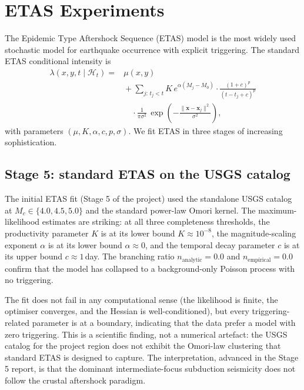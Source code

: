 \documentclass[10pt,a4paper,twocolumn]{article}
\begin{document}
\section{ETAS Experiments}\label{sec:etas-experiments}

The Epidemic Type Aftershock Sequence (ETAS) model \cite{ogata1988} is the most widely used stochastic model for earthquake occurrence with explicit triggering. The standard ETAS conditional intensity is
\begin{align*}
\lambda(x,y,t \mid \mathcal{H}_t) = {}& \mu(x,y) \\
&{} + \sum_{j:\,t_j<t} K\, e^{\alpha(M_j - M_0)} \cdot \frac{(1+c)^p}{(t - t_j + c)^p} \\
&{} \quad \cdot \frac{1}{\pi\sigma^2}\, \exp\!\left(-\frac{\|\mathbf{x} - \mathbf{x}_j\|^2}{\sigma^2}\right),
\end{align*}
with parameters $(\mu, K, \alpha, c, p, \sigma)$. We fit ETAS in three stages of increasing sophistication.

\subsection{Stage 5: standard ETAS on the USGS catalog}

The initial ETAS fit (Stage 5 of the project) used the standalone USGS catalog at $M_c\in\{4.0, 4.5, 5.0\}$ and the standard power-law Omori kernel. The maximum-likelihood estimates are striking: at all three completeness thresholds, the productivity parameter $K$ is at its lower bound $K\approx 10^{-8}$, the magnitude-scaling exponent $\alpha$ is at its lower bound $\alpha\approx0$, and the temporal decay parameter $c$ is at its upper bound $c\approx1$\,day. The branching ratio $n_{\text{analytic}} = 0.0$ and $n_{\text{empirical}} = 0.0$ confirm that the model has collapsed to a background-only Poisson process with no triggering.

The fit does not fail in any computational sense (the likelihood is finite, the optimiser converges, and the Hessian is well-conditioned), but every triggering-related parameter is at a boundary, indicating that the data prefer a model with zero triggering. This is a scientific finding, not a numerical artefact: the USGS catalog for the project region does not exhibit the Omori-law clustering that standard ETAS is designed to capture. The interpretation, advanced in the Stage 5 report, is that the dominant intermediate-focus subduction seismicity does not follow the crustal aftershock paradigm.
\end{document}
